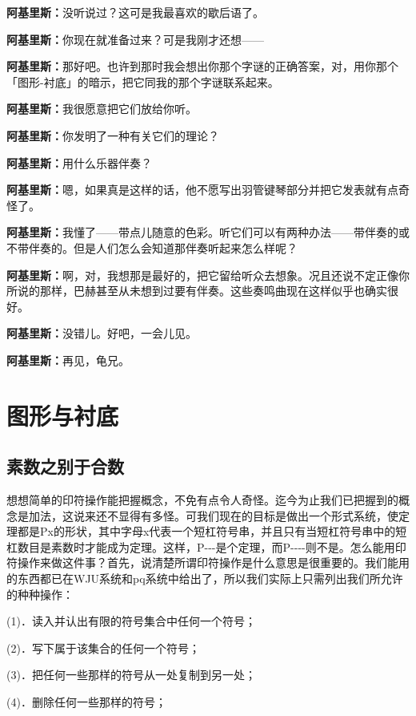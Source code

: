 \documentclass[
  12pt,
  twoside,
  openright,
  oldfontcommands,
]{memoir}
\newcommand{\dialogname}[1]{{\heifamily\bfseries #1}}
\begin{document}
\dialogname{阿基里斯：}没听说过？这可是我最喜欢的歇后语了。

\dialogname{阿基里斯：}你现在就准备过来？可是我刚才还想------

\dialogname{阿基里斯：}那好吧。也许到那时我会想出你那个字谜的正确答案，对，用你那个「图形-衬底」的暗示，把它同我的那个字谜联系起来。

\dialogname{阿基里斯：}我很愿意把它们放给你听。

\dialogname{阿基里斯：}你发明了一种有关它们的理论？

\dialogname{阿基里斯：}用什么乐器伴奏？

\dialogname{阿基里斯：}嗯，如果真是这样的话，他不愿写出羽管键琴部分并把它发表就有点奇怪了。

\dialogname{阿基里斯：}我懂了------带点儿随意的色彩。听它们可以有两种办法------带伴奏的或不带伴奏的。但是人们怎么会知道那伴奏听起来怎么样呢？

\dialogname{阿基里斯：}啊，对，我想那是最好的，把它留给听众去想象。况且还说不定正像你所说的那样，巴赫甚至从未想到过要有伴奏。这些奏鸣曲现在这样似乎也确实很好。

\dialogname{阿基里斯：}没错儿。好吧，一会儿见。

\dialogname{阿基里斯：}再见，龟兄。

\label{Chapter03.xhtml}{}

\chapter{图形与衬底}

\section{素数之别于合数}

想想简单的印符操作能把握概念，不免有点令人奇怪。迄今为止我们已把握到的概念是加法，这说来还不显得有多怪。可我们现在的目标是做出一个形式系统，使定理都是Px的形状，其中字母x代表一个短杠符号串，并且只有当短杠符号串中的短杠数目是素数时才能成为定理。这样，P-\/-\/-是个定理，而P-\/-\/-\/-则不是。怎么能用印符操作来做这件事？首先，说清楚所谓印符操作是什么意思是很重要的。我们能用的东西都已在WJU系统和pq系统中给出了，所以我们实际上只需列出我们所允许的种种操作：

(1)．读入并认出有限的符号集合中任何一个符号；

(2)．写下属于该集合的任何一个符号；

(3)．把任何一些那样的符号从一处复制到另一处；

(4)．删除任何一些那样的符号；
\end{document}
